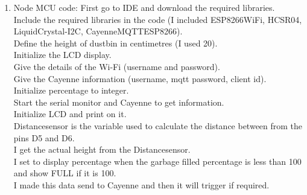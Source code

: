 \documentclass[12pt,letterpaper]{article}
\begin{document}
\begin{enumerate}
\begin{itemize}
    \end{itemize}
    \item Node MCU code: First go to IDE and download the required libraries.\\
    Include the required libraries in the code (I included ESP8266WiFi, HCSR04, LiquidCrystal-I2C, CayenneMQTTESP8266).\\
    Define the height of dustbin in centimetres (I used 20). \\
    Initialize the LCD display.\\ 
    Give the details of the Wi-Fi (username and password).\\
    Give the Cayenne information (username, mqtt password, client id).\\
    Initialize percentage to integer.\\
    Start the serial monitor and Cayenne to get information.\\
    Initialize LCD and print on it.\\
    Distancesensor is the variable used to calculate the distance between from the pins D5 and D6.\\
    I get the actual height from the Distancesensor.\\
    I set to display percentage when the garbage filled percentage is less than 100 and show FULL if it is 100. \\
    I made this data send to Cayenne and then it will trigger if required.\\
\end{enumerate}
\end{document}
